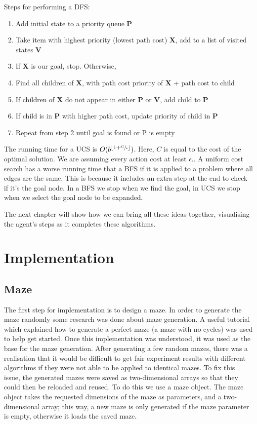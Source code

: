 \documentclass[]{final_report}
\begin{document}
Steps for performing a DFS:
\begin{enumerate}
    \item Add initial state to a priority queue \textbf{P}
    \item Take item with highest priority (lowest path cost) \textbf{X}, add to a list of visited states \textbf{V}
    \item If \textbf{X} is our goal, stop. Otherwise,
    \item Find all children of \textbf{X}, with path cost priority of \textbf{X} + path cost to child
    \item If children of \textbf{X} do not appear in either \textbf{P} or \textbf{V}, add child to \textbf{P}
    \item If child is in \textbf{P} with higher path cost, update priority of child in \textbf{P}
    \item Repeat from step 2 until goal is found or P is empty
    \end{enumerate}
    
The running time for a UCS is $O(b^{\lfloor 1+\sfrac{C}{\epsilon} \rfloor})$. Here, $C$ is equal to the cost of the optimal solution. We are assuming every action cost at least $\epsilon$.\cite{pathak2018comparative}. A uniform cost search has a worse running time that a BFS if it is applied to a problem where all edges are the same. This is because it includes an extra step at the end to check if it's the goal node. In a BFS we stop when we find the goal, in UCS we stop when we select the goal node to be expanded.\cite{time-complexity}

The next chapter will show how we can bring all these ideas together, visualising the agent's steps as it completes these algorithms.

\chapter{Implementation}
\section{Maze}\label{Maze implimentation}

The first step for implementation is to design a maze. In order to generate the maze randomly some research was done about maze generation. A useful tutorial\cite{maze} which explained how to generate a perfect maze (a maze with no cycles) was used to help get started. Once this implementation was understood, it was used as the base for the maze generation. After generating a few random mazes, there was a realisation that it would be difficult to get fair experiment results with different algorithms if they were not able to be applied to identical mazes. To fix this issue, the generated mazes were saved as two-dimensional arrays so that they could then be reloaded and reused. To do this we use a maze object. The maze object takes the requested dimensions of the maze as parameters, and a two-dimensional array; this way, a new maze is only generated if the maze parameter is empty, otherwise it loads the saved maze.
\end{document}
